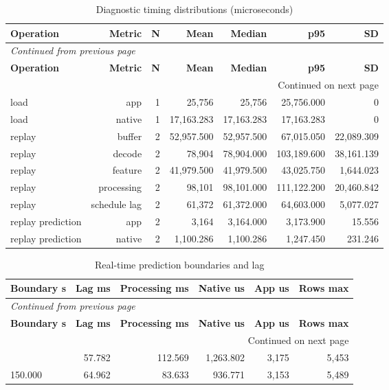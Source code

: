 \documentclass[10pt,a4paper]{article}
\begin{document}
\begingroup\small\setlength{\tabcolsep}{4pt}\renewcommand{\arraystretch}{1.12}
\begin{longtable}{@{}lrrrrrr@{}}
\caption{Diagnostic timing distributions (microseconds)}\\
\toprule
\textbf{Operation} & \textbf{Metric} & \textbf{N} & \textbf{Mean} & \textbf{Median} & \textbf{p95} & \textbf{SD} \\
\midrule\endfirsthead
\multicolumn{7}{l}{\small\itshape Continued from previous page}\\
\toprule
\textbf{Operation} & \textbf{Metric} & \textbf{N} & \textbf{Mean} & \textbf{Median} & \textbf{p95} & \textbf{SD} \\
\midrule\endhead
\midrule\multicolumn{7}{r}{\small Continued on next page}\\\endfoot
\bottomrule\endlastfoot
load & app & 1 & 25,756 & 25,756 & 25,756.000 & 0 \\
load & native & 1 & 17,163.283 & 17,163.283 & 17,163.283 & 0 \\
replay & buffer & 2 & 52,957.500 & 52,957.500 & 67,015.050 & 22,089.309 \\
replay & decode & 2 & 78,904 & 78,904.000 & 103,189.600 & 38,161.139 \\
replay & feature & 2 & 41,979.500 & 41,979.500 & 43,025.750 & 1,644.023 \\
replay & processing & 2 & 98,101 & 98,101.000 & 111,122.200 & 20,460.842 \\
replay & schedule lag & 2 & 61,372 & 61,372.000 & 64,603.000 & 5,077.027 \\
replay prediction & app & 2 & 3,164 & 3,164.000 & 3,173.900 & 15.556 \\
replay prediction & native & 2 & 1,100.286 & 1,100.286 & 1,247.450 & 231.246 \\
\end{longtable}\endgroup
\begingroup\small\setlength{\tabcolsep}{4pt}\renewcommand{\arraystretch}{1.12}
\begin{longtable}{@{}lrrrrr@{}}
\caption{Real-time prediction boundaries and lag}\\
\toprule
\textbf{Boundary s} & \textbf{Lag ms} & \textbf{Processing ms} & \textbf{Native us} & \textbf{App us} & \textbf{Rows max} \\
\midrule\endfirsthead
\multicolumn{6}{l}{\small\itshape Continued from previous page}\\
\toprule
\textbf{Boundary s} & \textbf{Lag ms} & \textbf{Processing ms} & \textbf{Native us} & \textbf{App us} & \textbf{Rows max} \\
\midrule\endhead
\midrule\multicolumn{6}{r}{\small Continued on next page}\\\endfoot
\bottomrule\endlastfoot
100.000 & 57.782 & 112.569 & 1,263.802 & 3,175 & 5,453 \\
150.000 & 64.962 & 83.633 & 936.771 & 3,153 & 5,489 \\
\end{longtable}\endgroup
\end{document}
